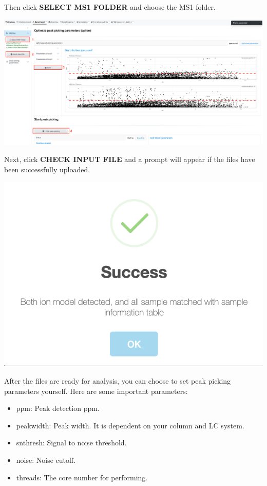 \documentclass[
]{book}
\providecommand{\tightlist}{%
  \setlength{\itemsep}{0pt}\setlength{\parskip}{0pt}}
\begin{document}
Then click \textbf{SELECT MS1 FOLDER} and choose the MS1 folder.

\includegraphics{figures/select_ms.png}

Next, click \textbf{CHECK INPUT FILE} and a prompt will appear if the files have been successfully uploaded.

\includegraphics{figures/correct_prompt.png}

After the files are ready for analysis, you can choose to set peak picking parameters yourself. Here are some important parameters:

\begin{itemize}
\tightlist
\item
  ppm: Peak detection ppm.
\item
  peakwidth: Peak width. It is dependent on your column and LC system.
\item
  snthresh: Signal to noise threshold.
\item
  noise: Noise cutoff.
\item
  threads: The core number for performing.
\end{itemize}
\end{document}
